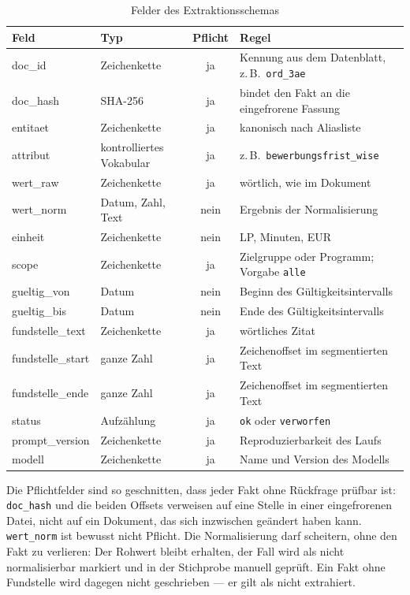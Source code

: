 \begin{table}[ht]
  \centering
  \caption{Felder des Extraktionsschemas}
  \label{tab:schema}
  \small
  \begin{tabular}{@{}>{\raggedright\arraybackslash}p{}>{\raggedright\arraybackslash}p{}c>{\raggedright\arraybackslash}p{}@{}}
    \toprule
    Feld & Typ & Pflicht & Regel \\
    \midrule
    doc\_id & Zeichenkette & ja & Kennung aus dem Datenblatt, z.\,B.\ \texttt{ord\_3ae} \\
    doc\_hash & SHA-256 & ja & bindet den Fakt an die eingefrorene Fassung \\
    entitaet & Zeichenkette & ja & kanonisch nach Aliasliste \\
    attribut & kontrolliertes Vokabular & ja & z.\,B.\ \texttt{bewerbungsfrist\_wise} \\
    wert\_raw & Zeichenkette & ja & wörtlich, wie im Dokument \\
    wert\_norm & Datum, Zahl, Text & nein & Ergebnis der Normalisierung \\
    einheit & Zeichenkette & nein & LP, Minuten, EUR \\
    scope & Zeichenkette & ja & Zielgruppe oder Programm; Vorgabe \texttt{alle} \\
    gueltig\_von & Datum & nein & Beginn des Gültigkeitsintervalls \\
    gueltig\_bis & Datum & nein & Ende des Gültigkeitsintervalls \\
    fundstelle\_text & Zeichenkette & ja & wörtliches Zitat \\
    fundstelle\_start & ganze Zahl & ja & Zeichenoffset im segmentierten Text \\
    fundstelle\_ende & ganze Zahl & ja & Zeichenoffset im segmentierten Text \\
    status & Aufzählung & ja & \texttt{ok} oder \texttt{verworfen} \\
    prompt\_version & Zeichenkette & ja & Reproduzierbarkeit des Laufs \\
    modell & Zeichenkette & ja & Name und Version des Modells \\
    \bottomrule
  \end{tabular}
\end{table}

Die Pflichtfelder sind so geschnitten, dass jeder Fakt ohne Rückfrage prüfbar ist:
\texttt{doc\_hash} und die beiden Offsets verweisen auf eine Stelle in einer eingefrorenen
Datei, nicht auf ein Dokument, das sich inzwischen geändert haben kann. \texttt{wert\_norm}
ist bewusst nicht Pflicht. Die Normalisierung darf scheitern, ohne den Fakt zu verlieren:
Der Rohwert bleibt erhalten, der Fall wird als nicht normalisierbar markiert und in der
Stichprobe manuell geprüft. Ein Fakt ohne Fundstelle wird dagegen nicht geschrieben --- er
gilt als nicht extrahiert.

